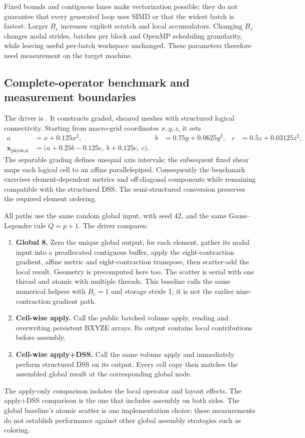 \documentclass[11pt]{article}
\begin{document}
Fixed bounds and contiguous lanes make vectorization possible; they do not
guarantee that every generated loop uses SIMD or that the widest batch is
fastest. Larger \(B_e\) increases explicit scratch and local accumulators.
Changing \(B_s\) changes nodal strides, batches per block and OpenMP scheduling
granularity, while leaving useful per-batch workspace unchanged.
These parameters therefore need measurement on the target machine.

\subsection{Complete-operator benchmark and measurement boundaries}

The driver is
.
It constructs graded, sheared meshes with structured logical connectivity.
Starting from macro-grid coordinates \(x,y,z\), it sets
\[
\begin{aligned}
 a&=x+0.125x^2,&b&=0.75y+0.0625y^2,&c&=0.5z+0.03125z^2,\\
 \boldsymbol{x}_{\mathrm{physical}}
 &=\bigl(a+0.25b-0.125c,\ b+0.125c,\ c\bigr).
\end{aligned}
\]
The separable grading defines unequal axis intervals; the subsequent fixed
shear maps each logical cell to an affine parallelepiped.
Consequently the benchmark exercises element-dependent metrics and
off-diagonal components while remaining compatible with the structured DSS.
The semi-structured conversion preserves the required element ordering.

All paths use the same random global input, with seed 42, and the same
Gauss--Legendre rule \(Q=p+1\). The driver compares:
\begin{enumerate}
 \item \textbf{Global 8.} Zero the unique global output; for each element,
 gather its nodal input into a preallocated contiguous buffer, apply the
 eight-contraction gradient, affine metric and eight-contraction transpose,
 then scatter-add the local result. Geometry is precomputed here too.
 The scatter is serial with one thread and atomic with multiple threads.
 This baseline calls the same numerical helpers with \(B_e=1\) and storage
 stride 1; it is not the earlier nine-contraction gradient path.
 \item \textbf{Cell-wise apply.} Call the public batched volume apply,
 reading and overwriting persistent BXYZE arrays. Its output contains local
 contributions before assembly.
 \item \textbf{Cell-wise apply+DSS.} Call the same volume apply and
 immediately perform structured DSS on its output. Every cell copy then
 matches the assembled global result at the corresponding global node.
\end{enumerate}
The apply-only comparison isolates the local operator and layout effects.
The apply+DSS comparison is the one that includes assembly on both sides.
The global baseline's atomic scatter is one implementation choice; these
measurements do not establish performance against other global assembly
strategies such as coloring.
\end{document}
